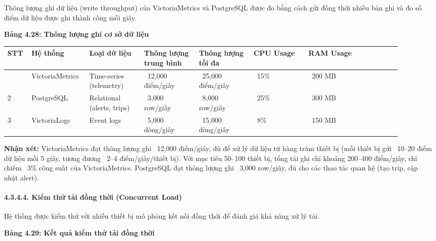 \documentclass[13pt,a4paper]{extarticle}
\newcounter{none} %
\newcommand{\thesislongtableorignewline}{}
\let\thesislongtableorignewline\\
\renewcommand{\\}{\thesislongtableorignewline\hline}%
\let\\\thesislongtableorignewline
\newcommand{\thesistabletitle}[1]{%
  \begin{center}\textbf{#1}\end{center}%
}
\begin{document}
Thông lượng ghi dữ liệu (write throughput) của VictoriaMetrics và
PostgreSQL được đo bằng cách gửi đồng thời nhiều bản ghi và đo số điểm
dữ liệu được ghi thành công mỗi giây.

\thesistabletitle{Bảng 4.28: Thông lượng ghi cơ sở dữ liệu}

{\def\LTcaptype{none} %
\begin{longtable}{|p{0.05\linewidth}|p{0.13\linewidth}|p{0.13\linewidth}|p{0.13\linewidth}|p{0.13\linewidth}|p{0.13\linewidth}|p{0.22\linewidth}|}
\hline \textbf{STT} & \textbf{Hệ thống} & \textbf{Loại dữ liệu} & \textbf{Thông lượng trung bình} & \textbf{Thông lượng tối
đa} & \textbf{CPU Usage} & \textbf{RAM Usage} \\
\hline
\endhead
\hline
\endlastfoot
1 & VictoriaMetrics & Time-series (telemetry) & ~12,000
điểm/giây & ~25,000 điểm/giây & ~15\% &
~200 MB \\
2 & PostgreSQL & Relational (alerts, trips) & ~3,000
row/giây & ~8,000 row/giây & ~25\% &
~300 MB \\
3 & VictoriaLogs & Event logs & ~5,000 dòng/giây &
~15,000 dòng/giây & ~8\% &
~150 MB \\
\end{longtable}
}

\textbf{Nhận xét:} VictoriaMetrics đạt thông lượng ghi
~12,000 điểm/giây, đủ để xử lý dữ liệu từ hàng trăm thiết
bị (mỗi thiết bị gửi ~10--20 điểm dữ liệu mỗi 5 giây,
tương đương ~2--4 điểm/giây/thiết bị). Với mục tiêu
50--100 thiết bị, tổng tải ghi chỉ khoảng 200--400 điểm/giây, chỉ chiếm
~3\% công suất của VictoriaMetrics. PostgreSQL đạt thông
lượng ghi ~3,000 row/giây, đủ cho các thao tác quan hệ
(tạo trip, cập nhật alert).

\paragraph{4.3.4.4. Kiểm thử tải đồng thời (Concurrent
Load)}\label{4344-kiux1ec3m-thux1eed-tux1ea3i-ux111ux1ed3ng-thux1eddi-concurrent-load}

Hệ thống được kiểm thử với nhiều thiết bị mô phỏng kết nối đồng thời để
đánh giá khả năng xử lý tải.

\thesistabletitle{Bảng 4.29: Kết quả kiểm thử tải đồng thời}
\end{document}
